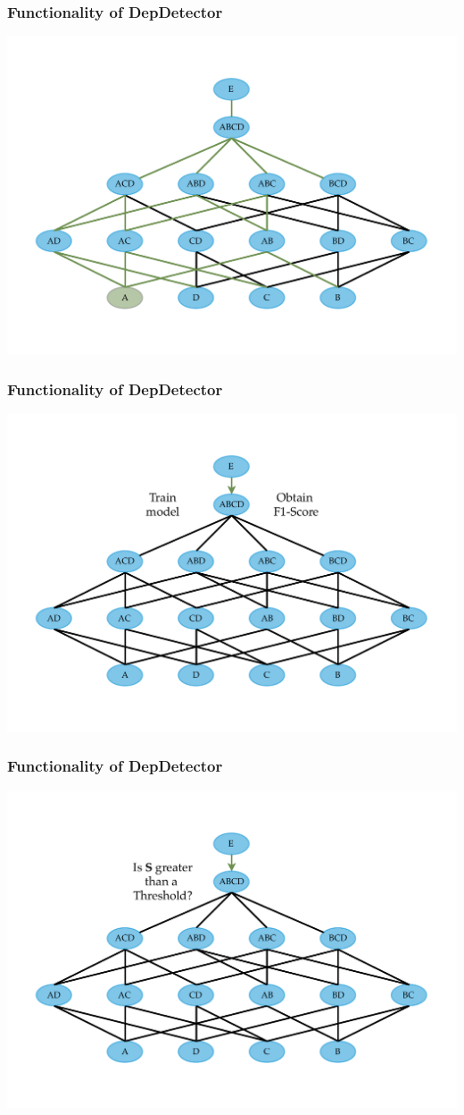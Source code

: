 \documentclass{beamer}
\begin{document}
\begin{frame}
    \frametitle{Functionality of DepDetector}
    \includegraphics[width=.95\textwidth]{search-tree-fd.pdf}
\end{frame}

\begin{frame}
    \frametitle{Functionality of DepDetector}
    \includegraphics[width=.95\textwidth]{min-dep-step-1.pdf}
\end{frame}

\begin{frame}
    \frametitle{Functionality of DepDetector}
    \includegraphics[width=.95\textwidth]{min-dep-step-2.pdf}
\end{frame}
\end{document}
